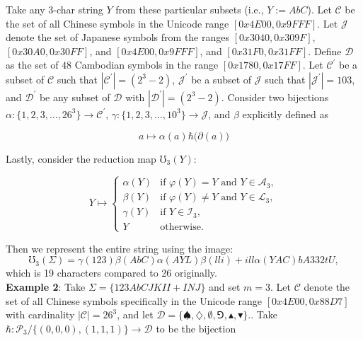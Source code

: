 \documentclass[amsmath,12pt,a4paper]{amsart}
\begin{document}
Take any $3$-char string $Y$ from these particular subsets (i.e., $Y := AbC$). Let $\mathcal{C}$ be the set of all Chinese symbols in the Unicode range $[0x4E00, 0x9FFF]$. Let $\mathcal{J}$ denote the set of Japanese symbols from the ranges $[0x3040, 0x309F]$, $[0x30A0, 0x30FF]$, and $[0x4E00, 0x9FFF]$, and $[0x31F0, 0x31FF]$. Define $\mathcal{D}$ as the set of $48$ Cambodian symbols in the range $[0x1780, 0x17FF]$. Let $\mathcal{C}^\prime$ be a subset of $\mathcal{C}$ such that $|\mathcal{C}^\prime| = (2^3-2)$, $\mathcal{J}^\prime$ be a subset of $\mathcal{J}$ such that $|\mathcal{J}^\prime| = 103$, and $\mathcal{D}^\prime$ be any subset of $\mathcal{D}$ with $|\mathcal{D}^\prime| = (2^3 - 2)$. Consider two bijections $\alpha : \{1, 2, 3, \ldots, 26^3\} \to \mathcal{C}^\prime$, $\gamma : \{1, 2, 3, \ldots, 10^3\} \to \mathcal{J}$, and $\beta$ explicitly defined as

$$
a \mapsto \alpha(a)\hbar \biggl(\partial (a)\biggr)
$$

Lastly, consider the reduction map $\mho_3(Y)$:

$$
Y \mapsto 
\begin{cases}
\alpha(Y) & \text{if } \varphi(Y) = Y \text{ and } Y \in \mathcal{A}_3, \\
\beta(Y)  & \text{if } \varphi(Y) \neq Y \text{ and } Y \in \mathcal{L}_3, \\
\gamma(Y) & \text{if } Y \in \mathcal{I}_3, \\
Y         & \text{otherwise}.
\end{cases}
$$

Then we represent the entire string using the image:
$$
\mho_3(\Sigma) = \gamma(123) \beta(AbC) \alpha(AYL) \beta(lli) + ill \alpha(Y AC) bA332tU,
$$
which is 19 characters compared to 26 originally.\\


\textbf{Example 2}: Take $\Sigma = \{123AbCJKII + INJ\}$ and set $m = 3$. Let $\mathcal{C}$ denote the set of all Chinese symbols specifically in the Unicode range $[0x4E00, 0x88D7]$ with cardinality $|\mathcal{C}| = 26^3$, and let $
\mathcal{D} = \{\spadesuit, \diamondsuit, \emptyset, \Game,\blacktriangle , \blacktriangledown\}.
$. Take $\hbar: \mathcal{P}_3 / \{(0, 0, 0), (1, 1, 1)\} \to \mathcal{D}$ to be the bijection
\end{document}
